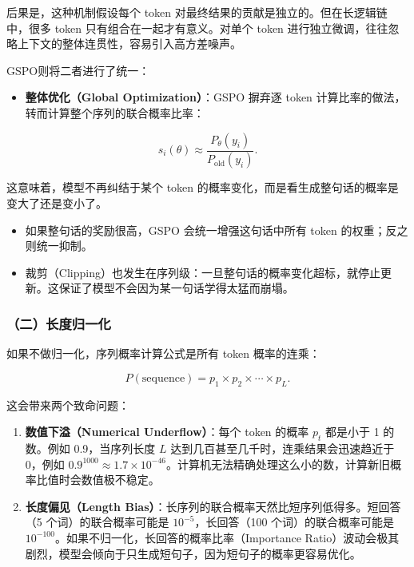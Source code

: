 后果是，这种机制假设每个 token 对最终结果的贡献是独立的。但在长逻辑链中，很多 token 只有组合在一起才有意义。对单个 token 进行独立微调，往往忽略上下文的整体连贯性，容易引入高方差噪声。

GSPO则将二者进行了统一：

\begin{itemize}
\tightlist
\item
  \textbf{整体优化（Global Optimization）}：GSPO 摒弃逐 token 计算比率的做法，转而计算整个序列的联合概率比率：
\end{itemize}

\[
s_i(\theta)
\approx
\frac{P_\theta(y_i)}
{P_{\mathrm{old}}(y_i)}.
\]

这意味着，模型不再纠结于某个 token 的概率变化，而是看生成整句话的概率是变大了还是变小了。

\begin{itemize}
\tightlist
\item
  如果整句话的奖励很高，GSPO 会统一增强这句话中所有 token 的权重；反之则统一抑制。
\item
  裁剪（Clipping）也发生在序列级：一旦整句话的概率变化超标，就停止更新。这保证了模型不会因为某一句话学得太猛而崩塌。
\end{itemize}

\hypertarget{ux4e8cux957fux5ea6ux5f52ux4e00ux5316}{%
\subsubsection{（二）长度归一化}\label{ux4e8cux957fux5ea6ux5f52ux4e00ux5316}}

如果不做归一化，序列概率计算公式是所有 token 概率的连乘：

\[
P(\mathrm{sequence})
=
p_1\times p_2\times\cdots\times p_L.
\]

这会带来两个致命问题：

\begin{enumerate}
\def\labelenumi{\arabic{enumi}.}
\tightlist
\item
  \textbf{数值下溢（Numerical Underflow）}：每个 token 的概率 \(p_t\) 都是小于 1 的数。例如 0.9，当序列长度 \(L\) 达到几百甚至几千时，连乘结果会迅速趋近于 0，例如 \(0.9^{1000}\approx 1.7\times 10^{-46}\)。计算机无法精确处理这么小的数，计算新旧概率比值时会数值极不稳定。
\item
  \textbf{长度偏见（Length Bias）}：长序列的联合概率天然比短序列低得多。短回答（5 个词）的联合概率可能是 \(10^{-5}\)，长回答（100 个词）的联合概率可能是 \(10^{-100}\)。如果不归一化，长回答的概率比率（Importance Ratio）波动会极其剧烈，模型会倾向于只生成短句子，因为短句子的概率更容易优化。
\end{enumerate}

